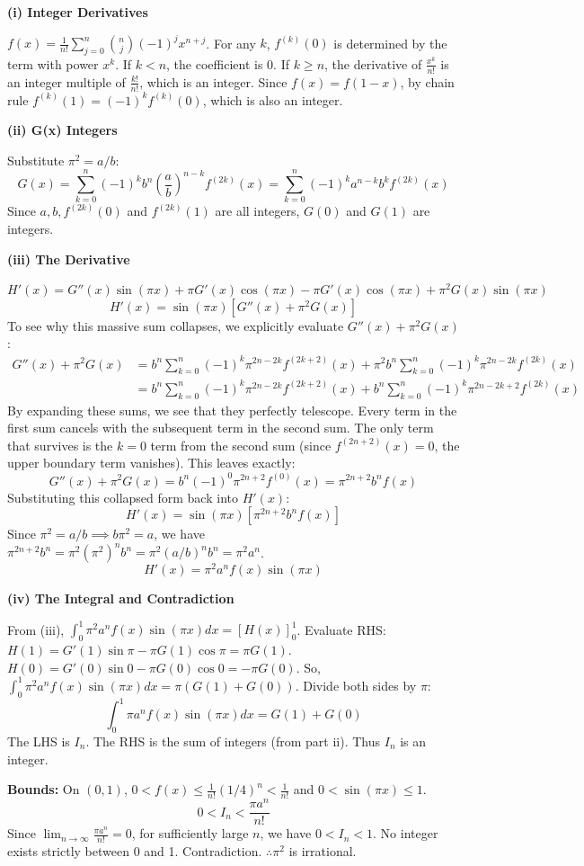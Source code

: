 \begin{solution}
\textbf{(i) Integer Derivatives}

$f(x) = \frac{1}{n!} \sum_{j=0}^n \binom{n}{j} (-1)^j x^{n+j}$.
For any $k$, $f^{(k)}(0)$ is determined by the term with power $x^k$. If $k < n$, the coefficient is 0. If $k \ge n$, the derivative of $\frac{x^k}{n!}$ is an integer multiple of $\frac{k!}{n!}$, which is an integer.
Since $f(x) = f(1-x)$, by chain rule $f^{(k)}(1) = (-1)^k f^{(k)}(0)$, which is also an integer.

\textbf{(ii) G(x) Integers}

Substitute $\pi^2 = a/b$:
$$ G(x) = \sum_{k=0}^n (-1)^k b^n \left(\frac{a}{b}\right)^{n-k} f^{(2k)}(x) = \sum_{k=0}^n (-1)^k a^{n-k} b^k f^{(2k)}(x) $$
Since $a, b, f^{(2k)}(0)$ and $f^{(2k)}(1)$ are all integers, $G(0)$ and $G(1)$ are integers.

\textbf{(iii) The Derivative}

$H'(x) = G''(x)\sin(\pi x) + \pi G'(x)\cos(\pi x) - \pi G'(x)\cos(\pi x) + \pi^2 G(x)\sin(\pi x)$
$$ H'(x) = \sin(\pi x) [ G''(x) + \pi^2 G(x) ] $$
To see why this massive sum collapses, we explicitly evaluate $G''(x) + \pi^2 G(x)$:
\begin{align*}
G''(x) + \pi^2 G(x) &= b^n \sum_{k=0}^n (-1)^k \pi^{2n-2k} f^{(2k+2)}(x) + \pi^2 b^n \sum_{k=0}^n (-1)^k \pi^{2n-2k} f^{(2k)}(x) \\
&= b^n \sum_{k=0}^n (-1)^k \pi^{2n-2k} f^{(2k+2)}(x) + b^n \sum_{k=0}^n (-1)^k \pi^{2n-2k+2} f^{(2k)}(x)
\end{align*}
By expanding these sums, we see that they perfectly telescope. Every term in the first sum cancels with the subsequent term in the second sum. The only term that survives is the $k=0$ term from the second sum (since $f^{(2n+2)}(x) = 0$, the upper boundary term vanishes). This leaves exactly:
$$ G''(x) + \pi^2 G(x) = b^n (-1)^0 \pi^{2n+2} f^{(0)}(x) = \pi^{2n+2} b^n f(x) $$
Substituting this collapsed form back into $H'(x)$:
$$ H'(x) = \sin(\pi x) [ \pi^{2n+2} b^n f(x) ] $$
Since $\pi^2 = a/b \implies b \pi^2 = a$, we have $\pi^{2n+2} b^n = \pi^2 (\pi^2)^n b^n = \pi^2 (a/b)^n b^n = \pi^2 a^n$.
$$ H'(x) = \pi^2 a^n f(x) \sin(\pi x) $$

\textbf{(iv) The Integral and Contradiction}

From (iii), $\int_0^1 \pi^2 a^n f(x) \sin(\pi x) dx = [H(x)]_0^1$.
Evaluate RHS:
$H(1) = G'(1)\sin \pi - \pi G(1)\cos \pi = \pi G(1)$.
$H(0) = G'(0)\sin 0 - \pi G(0)\cos 0 = -\pi G(0)$.
So, $\int_0^1 \pi^2 a^n f(x) \sin(\pi x) dx = \pi(G(1) + G(0))$.
Divide both sides by $\pi$:
$$ \int_0^1 \pi a^n f(x) \sin(\pi x) dx = G(1) + G(0) $$
The LHS is $I_n$. The RHS is the sum of integers (from part ii). Thus $I_n$ is an integer.

\textbf{Bounds:} On $(0,1)$, $0 < f(x) \le \frac{1}{n!} (1/4)^n < \frac{1}{n!}$ and $0 < \sin(\pi x) \le 1$.
$$ 0 < I_n < \frac{\pi a^n}{n!} $$
Since $\lim_{n \to \infty} \frac{\pi a^n}{n!} = 0$, for sufficiently large $n$, we have $0 < I_n < 1$.
No integer exists strictly between 0 and 1. Contradiction.
$\therefore \pi^2$ is irrational.
\end{solution}

